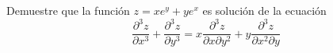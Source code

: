 \item Demuestre que la función $z = x e^y + y e^x$ es solución de la ecuación
\[ \frac{\partial^3 z}{\partial x^3} + \frac{\partial^3 z}{\partial y^3} = x \frac{\partial^3 z}{\partial x \partial y^2} + y \frac{\partial^3 z}{\partial x^2 \partial y} \]
